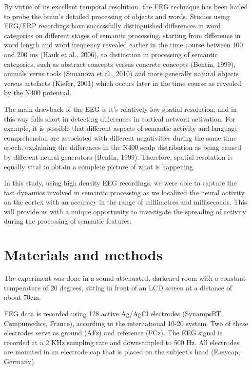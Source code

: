 By virtue of its excellent temporal resolution, the EEG technique has been hailed to probe the brain's detailed processing of objects and words. Studies using EEG/ERP recordings have successfully distinguished differences in word categories on different stages of semantic processing, starting from difference in word length and word frequency revealed earlier in the time course between 100 and 200 ms (Hauk et al., 2006), to distinction in processing of semantic categories, such as abstract concepts versus concrete concepts (Bentin, 1999), animals verus tools (Simanova et al., 2010) and more generally natural objects versus artefacts (Kiefer, 2001) which occurs later in the time course as revealed by the N400 potential.

The main drawback of the EEG is it's relatively low spatial resolution, and in this way falls short in detecting differences in cortical network activation. For example, it is possible that different aspects of semantic activity and language comprehension are associated with different negativities during the same time epoch, explaining the differences in the N400 scalp distribution as being caused by different neural generators (Bentin, 1999). Therefore, spatial resolution is equally vital to obtain a complete picture of what is happening.

In this study, using high density EEG recordings, we were able to capture the fast dynamics involved in semantic processing as we localized the neural activity on the cortex with an accuracy in the range of millimetres and milliseconds. This will provide us with a unique opportunity to investigate the spreading of activity during the processing of semantic features.

\section{Materials and methods}

The experiment was done in a sound-attenuated, darkened room with a constant temperature of 20 degrees, sitting in front of an LCD screen at a distance of about 70cm.

EEG data is recorded using 128 active Ag/AgCl electrodes (SynampsRT, Compumedics, France), according to the international 10-20 system. Two of these electrodes serve as ground (AFz) and reference (FCz). The EEG signal is recorded at a 2 KHz sampling rate and downsampled to 500 Hz. All electrodes are mounted in an electrode cap that is placed on the subject's head (Easycap, Germany). 

